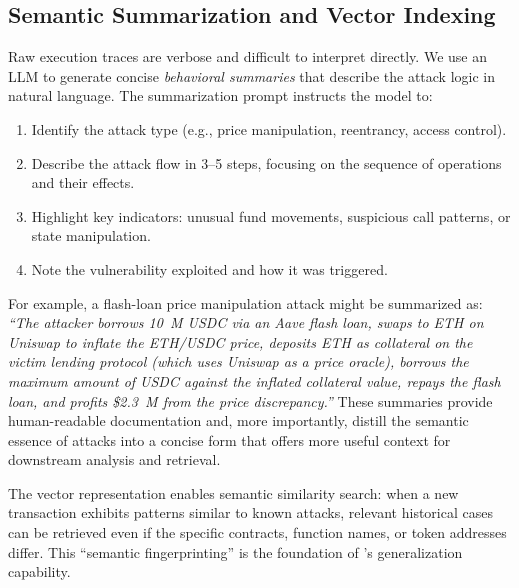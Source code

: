 \subsection{Semantic Summarization and Vector Indexing}

Raw execution traces are verbose and difficult to interpret directly. We use an LLM to generate concise \textit{behavioral summaries} that describe the attack logic in natural language. The summarization prompt instructs the model to:

\begin{enumerate}
    \item Identify the attack type (e.g., price manipulation, reentrancy, access control).
    \item Describe the attack flow in 3--5 steps, focusing on the sequence of operations and their effects.
    \item Highlight key indicators: unusual fund movements, suspicious call patterns, or state manipulation.
    \item Note the vulnerability exploited and how it was triggered.
\end{enumerate}

For example, a flash-loan price manipulation attack might be summarized as: \textit{``The attacker borrows 10~M USDC via an Aave flash loan, swaps to ETH on Uniswap to inflate the ETH/USDC price, deposits ETH as collateral on the victim lending protocol (which uses Uniswap as a price oracle), borrows the maximum amount of USDC against the inflated collateral value, repays the flash loan, and profits \$2.3~M from the price discrepancy.''}
These summaries provide human-readable documentation and, more importantly, distill the semantic essence of attacks into a concise form that offers more useful context for downstream analysis and retrieval.


The vector representation enables semantic similarity search: when a new transaction exhibits patterns similar to known attacks, relevant historical cases can be retrieved even if the specific contracts, function names, or token addresses differ. This ``semantic fingerprinting'' is the foundation of \approach's generalization capability.

